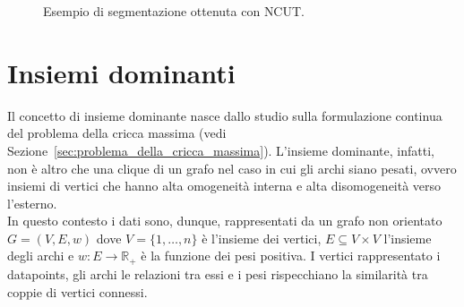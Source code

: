 \begin{figure}[h!]
    \centering
	\caption{Esempio di segmentazione ottenuta con NCUT.}
\end{figure}



\newpage


\section{Insiemi dominanti} %

Il concetto di insieme dominante nasce dallo studio sulla formulazione continua del problema della cricca massima (vedi Sezione~\ref{sec:problema_della_cricca_massima}). L'insieme dominante, infatti, non è altro che una clique di un grafo nel caso in cui gli archi siano pesati, ovvero insiemi di vertici che hanno alta omogeneità interna e alta disomogeneità verso l'esterno.\\

In questo contesto i dati sono, dunque, rappresentati da un grafo non orientato $G = (V, E , w)$ dove $V = \{ 1, \dots, n \}$ è l'insieme dei vertici, $E\subseteq V \times V$ l'insieme degli archi e $w : E \rightarrow \mathbb{R}_+$ è la funzione dei pesi positiva. I vertici rappresentato i datapoints, gli archi le relazioni tra essi e i pesi rispecchiano la similarità tra coppie di vertici connessi.\\

